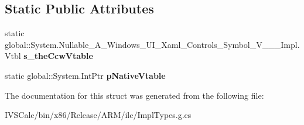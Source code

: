 \subsection*{Static Public Attributes}
\begin{DoxyCompactItemize}
\item 
\mbox{\label{struct_system_1_1_nullable___a___windows___u_i___xaml___controls___symbol___v_______impl_1_1_vtbl_a60d8fd72d720c171dc53cb9c05e6477a}} 
static global\+::\+System.\+Nullable\+\_\+\+A\+\_\+\+Windows\+\_\+\+U\+I\+\_\+\+Xaml\+\_\+\+Controls\+\_\+\+Symbol\+\_\+\+V\+\_\+\+\_\+\+\_\+\+Impl.\+Vtbl {\bfseries s\+\_\+the\+Ccw\+Vtable}
\item 
\mbox{\label{struct_system_1_1_nullable___a___windows___u_i___xaml___controls___symbol___v_______impl_1_1_vtbl_ac43b4aee1e506c064cb9ad5379f13308}} 
static global\+::\+System.\+Int\+Ptr {\bfseries p\+Native\+Vtable}
\end{DoxyCompactItemize}


The documentation for this struct was generated from the following file\+:\begin{DoxyCompactItemize}
\item 
I\+V\+S\+Calc/bin/x86/\+Release/\+A\+R\+M/ilc/Impl\+Types.\+g.\+cs\end{DoxyCompactItemize}
